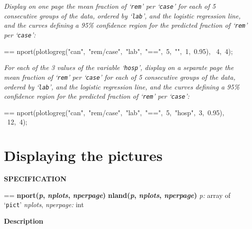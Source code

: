 \documentclass{book}
\makeatletter
\newcommand\Texinfocommandstyletextvar[1]{{\normalfont{}\textsl{#1}}}%
\newenvironment{Texinfopreformatted}{%
  \par\GNUTobeylines\obeyspaces\frenchspacing\parskip=\z@\parindent=\z@}{}
{\catcode`\^^M=13 \gdef\GNUTobeylines{\catcode`\^^M=13 \def^^M{\null\par}}}
\newenvironment{Texinfoindented}{\begin{list}{}{}\item\relax}{\end{list}}
\renewcommand{\_}{\Texinfounderscore\discretionary{}{}{}}
\makeatother
\begin{document}
\emph{Display on one page the mean fraction of `\texttt{rem}' per
`\texttt{case}' for each
of 5 consecutive groups of the data, ordered by `\texttt{lab}',
and the logistic regression line,
and the curves defining a 95\% confidence region for the predicted
fraction of `\texttt{rem}' per `\texttt{case}':}
\begin{Texinfoindented}
\begin{Texinfopreformatted}%
\ttfamily nport(plotlogreg("can",\ "rem/case",\ "lab",\ "==",\ 5,\ "",\ 1,\ 0.95),
\      4,\ 4);
\end{Texinfopreformatted}
\end{Texinfoindented}

\emph{For each of the 3 values of the variable `\texttt{hosp}',
display on a separate page the mean fraction of `\texttt{rem}' per
`\texttt{case}' for each
of 5 consecutive groups of the data, ordered by `\texttt{lab}',
and the logistic regression line,
and the curves defining a 95\% confidence region for the predicted
fraction of `\texttt{rem}' per `\texttt{case}':}
\begin{Texinfoindented}
\begin{Texinfopreformatted}%
\ttfamily nport(plotlogreg("can",\ "rem/case",\ "lab",\ "==",\ 5,\ "hosp",\ 3,\ 0.95),
\      12,\ 4);
\end{Texinfopreformatted}
\end{Texinfoindented}

\section{{Displaying the pictures}}
\label{anchor:Displaying-the-pictures}%

\noindent{}\textbf{SPECIFICATION}
\begin{Texinfoindented}
\begin{Texinfopreformatted}%
\textbf{nport(\Texinfocommandstyletextvar{p}, \Texinfocommandstyletextvar{nplots}, \Texinfocommandstyletextvar{nperpage})}
\textbf{nland(\Texinfocommandstyletextvar{p}, \Texinfocommandstyletextvar{nplots}, \Texinfocommandstyletextvar{nperpage})}
\Texinfocommandstyletextvar{p:} array of `\texttt{pict}'
\Texinfocommandstyletextvar{nplots}, \Texinfocommandstyletextvar{nperpage:} int
\end{Texinfopreformatted}
\end{Texinfoindented}

%
%

\noindent{}\textbf{Description}
\end{document}
